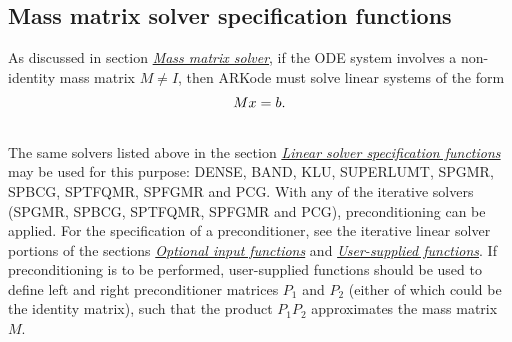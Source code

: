 \documentclass[letterpaper,10pt,english]{sphinxmanual}
\begin{document}
\subsection{Mass matrix solver specification functions}
\label{c_interface/User_callable:cinterface-massmatrixsolvers}\label{c_interface/User_callable:mass-matrix-solver-specification-functions}
As discussed in section {\hyperref[Mathematics:mathematics-masssolve]{\emph{Mass matrix solver}}}, if the ODE
system involves a non-identity mass matrix $M\ne I$, then ARKode
must solve linear systems of the form
\begin{gather}
\begin{split}M x = b.\end{split}\notag\\\begin{split}\end{split}\notag
\end{gather}
The same solvers listed above in the section
{\hyperref[c_interface/User_callable:cinterface-linearsolvers]{\emph{Linear solver specification functions}}} may be used for this purpose:
DENSE, BAND, KLU, SUPERLUMT, SPGMR, SPBCG, SPTFQMR, SPFGMR and PCG.
With any of the iterative solvers (SPGMR, SPBCG, SPTFQMR, SPFGMR and PCG),
preconditioning can be applied.  For the specification of a
preconditioner, see the iterative linear solver portions of the sections
{\hyperref[c_interface/User_callable:cinterface-optionalinputs]{\emph{Optional input functions}}} and {\hyperref[c_interface/User_supplied:cinterface-usersupplied]{\emph{User-supplied functions}}}.
If preconditioning is to be performed, user-supplied functions should
be used to define left and right preconditioner matrices $P_1$ and
$P_2$ (either of which could be the identity matrix), such that
the product $P_{1}P_{2}$ approximates the mass matrix $M$.
\end{document}
